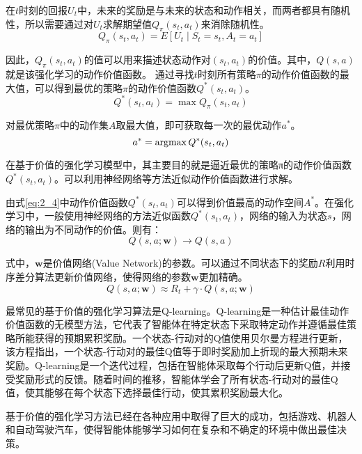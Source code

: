 在$t$时刻的回报$U_t$中，未来的奖励是与未来的状态和动作相关，而两者都具有随机性，所以需要通过对$U_t$求解期望值$Q_π (s_t,a_t)$来消除随机性。
\begin{equation}
  \label{eq:2_2}
  Q_π (s_t,a_t) = E[U_t\mid S_t=s_t, A_t = a_t]
\end{equation}

因此，$Q_π (s_t,a_t)$的值可以用来描述状态动作对$(s_t,a_t )$的价值。其中，$Q(s,a)$就是该强化学习的动作价值函数。
通过寻找$t$时刻所有策略$\pi$的动作价值函数的最大值，可以得到最优的策略$\pi$的动作价值函数$Q^* (s_t,a_t )$。
\begin{equation}
  \label{eq:2_3}
  Q^* (s_t,a_t) = \max Q_π (s_t,a_t)
\end{equation}

对最优策略$\pi$中的动作集$A$取最大值，即可获取每一次的最优动作$a^*$。
\begin{equation}
  \label{eq:2_4}
  a^* = \operatorname*{argmax} Q^* (s_t,a_t)
\end{equation}

在基于价值的强化学习模型中，其主要目的就是逼近最优的策略π的动作价值函数$Q^* (s_t,a_t )$。可以利用神经网络等方法近似动作价值函数进行求解。

由式\ref{eq:2_4}中动作价值函数$Q^* (s_t,a_t )$可以得到价值最高的动作空间$A^*$。在强化学习中，一般使用神经网络的方法近似函数$Q^* (s_t,a_t )$，网络的输入为状态$s$，网络的输出为不同动作的价值。则有：
\begin{equation}
  \label{eq:2_5}
  Q(s,a;\mathbf{w}) \rightarrow Q(s,a)
\end{equation}

	式中，$\mathbf{w}$是价值网络(Value Network)的参数。可以通过不同状态下的奖励$R$利用时序差分算法更新价值网络，使得网络的参数$\mathbf{w}$更加精确。
\begin{equation}
  \label{eq:2_6}
  Q(s,a;\mathbf{w}) \approx R_t + \gamma \cdot Q(s,a;\mathbf{w})
\end{equation}

最常见的基于价值的强化学习算法是Q-learning。Q-learning是一种估计最佳动作价值函数的无模型方法，它代表了智能体在特定状态下采取特定动作并遵循最佳策略所能获得的预期累积奖励。一个状态-行动对的Q值使用贝尔曼方程进行更新，该方程指出，一个状态-行动对的最佳Q值等于即时奖励加上折现的最大预期未来奖励。Q-learning是一个迭代过程，包括在智能体采取每个行动后更新Q值，并接受奖励形式的反馈。随着时间的推移，智能体学会了所有状态-行动对的最佳Q值，使其能够在每个状态下选择最佳行动，使其累积奖励最大化。

基于价值的强化学习方法已经在各种应用中取得了巨大的成功，包括游戏、机器人和自动驾驶汽车，使得智能体能够学习如何在复杂和不确定的环境中做出最佳决策。


